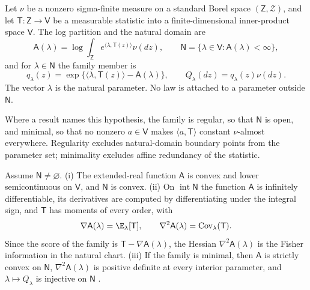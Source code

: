 Let \(\nu\) be a nonzero sigma-finite measure on a standard Borel space
\((\mathsf Z,\mathscr Z)\), and let \(\mathsf T:\mathsf Z\to\mathsf V\) be a
measurable statistic into a finite-dimensional inner-product space
\(\mathsf V\). The log partition and the natural domain are
\begin{equation}
\mathsf A(\lambda)
=\log\int_{\mathsf Z}e^{\langle\lambda,\mathsf T(z)\rangle}\nu(dz),
\qquad
\mathsf N=\{\lambda\in\mathsf V:\mathsf A(\lambda)<\infty\},
\label{eq:exp-logpartition}
\end{equation}
and for \(\lambda\in\mathsf N\) the family member is
\begin{equation}
q_\lambda(z)
=\exp\{\langle\lambda,\mathsf T(z)\rangle-\mathsf A(\lambda)\},
\qquad
Q_\lambda(dz)=q_\lambda(z)\nu(dz).
\label{eq:exp-density}
\end{equation}
The vector \(\lambda\) is the natural parameter. No law is attached to a
parameter outside \(\mathsf N\).

Where a result names this hypothesis, the family is regular, so that
\(\mathsf N\) is open, and minimal, so that no nonzero \(a\in\mathsf V\) makes
\(\langle a,\mathsf T\rangle\) constant \(\nu\)-almost everywhere. Regularity
excludes natural-domain boundary points from the parameter set; minimality
excludes affine redundancy of the statistic.

Assume \(\mathsf N\neq\varnothing\). (i) The extended-real function
\(\mathsf A\) is convex and lower semicontinuous on \(\mathsf V\), and
\(\mathsf N\) is convex. (ii) On \(\operatorname{int}\mathsf N\) the function
\(\mathsf A\) is infinitely differentiable, its derivatives are computed by
differentiating under the integral sign, and \(\mathsf T\) has moments of
every order, with
\begin{equation}
\nabla\mathsf A(\lambda)=\E_\lambda[\mathsf T],
\qquad
\nabla^2\mathsf A(\lambda)=\operatorname{Cov}_\lambda(\mathsf T).
\label{eq:exp-cumulants}
\end{equation}
Since the score of the family is \(\mathsf T-\nabla\mathsf A(\lambda)\), the
Hessian \(\nabla^2\mathsf A(\lambda)\) is the Fisher information in the
natural chart. (iii) If the family is minimal, then \(\mathsf A\) is strictly
convex on \(\mathsf N\), \(\nabla^2\mathsf A(\lambda)\) is positive definite at
every interior parameter, and \(\lambda\mapsto Q_\lambda\) is injective on
\(\mathsf N\) \citep[Theorems~7.1, 7.2 and~8.1 and Section~8.1]{BarndorffNielsen1978}.


